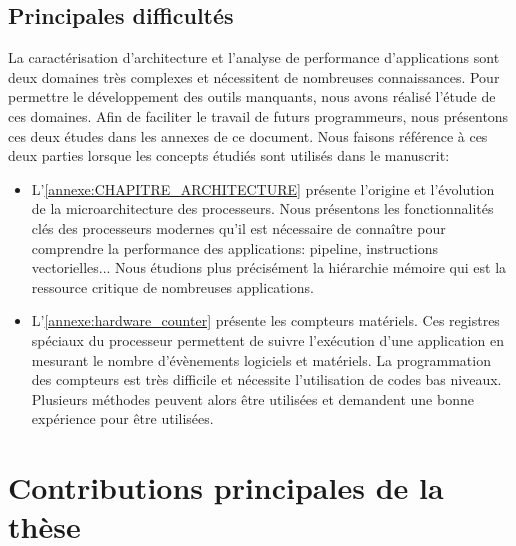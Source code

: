     \subsection{Principales difficultés}
    
        La caractérisation d'architecture et l'analyse de performance d'applications sont deux domaines très complexes et nécessitent de nombreuses connaissances. Pour permettre le développement des outils manquants, nous avons réalisé l'étude de ces domaines. Afin de faciliter le travail de futurs programmeurs, nous présentons ces deux études dans les annexes de ce document. Nous faisons référence à ces deux parties lorsque les concepts étudiés sont utilisés dans le manuscrit:
        \begin{itemize}
            \item L'\autoref{annexe:CHAPITRE_ARCHITECTURE} présente l'origine et l'évolution de la microarchitecture des processeurs. Nous présentons les fonctionnalités clés des processeurs modernes qu'il est nécessaire de connaître pour comprendre la performance des applications: pipeline, instructions vectorielles... Nous étudions plus précisément la hiérarchie mémoire qui est la ressource critique de nombreuses applications. 
            
            \item L'\autoref{annexe:hardware_counter} présente les compteurs matériels. Ces registres spéciaux du processeur permettent de suivre l'exécution d'une application en mesurant le nombre d'évènements logiciels et matériels. La programmation des compteurs est très difficile et nécessite l'utilisation de codes bas niveaux. Plusieurs méthodes peuvent alors être utilisées et demandent une bonne expérience pour être utilisées.
        \end{itemize}
        
        


\section{Contributions principales de la thèse}
 
   

